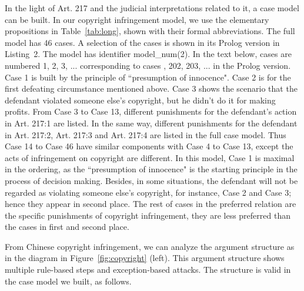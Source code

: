 \documentclass{IOS-Book-Article}
\begin{document}
In the light of Art. 217 and the judicial interpretations related to it, a case model can be built. 
In our copyright infringement model, we use the elementary propositions in \mbox{Table}~\ref{tab:long}, shown with their formal abbreviations. 
The full model has 46 cases. A selection of the cases is shown in its Prolog version in Listing~2. The model has identifier {\mf model\_num(2)}. 
In the text below, cases are numbered 1, 2, 3, ... corresponding  to cases {, 202, 203, ...} in the Prolog version.
Case 1 is built by the principle of ``presumption of innocence". Case 2 is for the first defeating circumstance mentioned above. Case 3 shows the scenario that the defendant violated someone else's copyright, but he didn't do it for making profits. From Case 3 to Case 13, different punishments for the defendant's action in Art. 217:1 are listed. In the same way, different punishments for the defendant in Art. 217:2, Art. 217:3 and Art. 217:4 are listed in the full case model. Thus Case 14 to Case 46 have similar components with Case 4 to Case 13, except the acts of infringement on copyright are different. In this model, Case 1 is maximal in the ordering, as the ``presumption of innocence" is the starting principle in the process of decision making. Besides, in some situations, the defendant will not be regarded as violating someone else's copyright, for instance, Case 2 and Case 3; hence they appear in second place. The rest of cases in the preferred relation are the specific punishments of copyright infringement, they are less preferred than the cases in first and second place.

From Chinese copyright infringement, we can analyze the argument structure as in the diagram in Figure~\ref{fig:copyright} (left). This argument structure shows multiple rule-based steps and exception-based attacks. The structure is valid in the case model we built, as follows.
\end{document}
